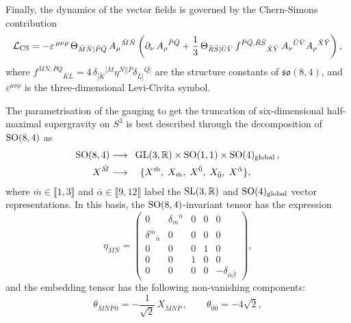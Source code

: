 \documentclass[11pt,a4paper]{article}
\newcommand{\bM}{{\bar{M}}}
\newcommand{\bN}{{\bar{N}}}
\newcommand{\bP}{{\bar{P}}}
\newcommand{\bzero}{{\bar{0}}}
\newcommand{\balpha}{{\bar{\alpha}}}
\newcommand{\bbeta}{{\bar{\beta}}}
\begin{document}
Finally, the dynamics of the vector fields is governed by the Chern-Simons contribution
%
\begin{equation}
	{\cal L}_{\rm CS}= -\varepsilon^{\,\mu\nu\rho}\,\Theta_{\bar M\bar N|\bar P\bar Q}\,A_{\mu}{}^{\bar M\bar N}\left(\partial_{\nu}\,A_{\rho}{}^{\bar P\bar Q}  + \frac{1}{3}\, \Theta_{\bar R\bar S|\bar U\bar V}\,f^{\bar P\bar Q,\bar R\bar S}{}_{\bar X\bar Y}\, A_{\nu}{}^{\bar U\bar V} A_{\rho}{}^{\bar X\bar Y} \right),
\end{equation}
%
where $f^{\bar M\bar N,\bar P\bar Q}{}_{\bar K\bar L} = 4\,\delta_{[\bar K}{}^{[\bar M}\eta^{\bar N][\bar P}\delta_{\bar L]}{}^{\bar Q]}$ are the structure constants of $\mathfrak{so}(8,4)$, and $\varepsilon^{\mu\nu\rho}$ is the three-dimensional Levi-Civita symbol.

The parametrisation of the gauging to get the truncation of six-dimensional half-maximal supergravity on $S^{3}$ is best described through the decomposition of ${\rm SO}(8,4)$ as~\cite{Eloy:2021fhc} 
%
\begin{equation}	\label{eq: gl3gradingbar}
	\begin{aligned}
		\text{SO}(8,4)	&\longrightarrow	\enspace \text{GL}(3,\mathbb{R})\times\text{SO}(1,1)\times\text{SO}(4)_{\rm global}\,,	\\
		X^{\bM}		&\longrightarrow	\quad \{X^{\bar m},\; X_{\bar m},\; X^\bzero,\; X_\bzero,\; X^\balpha\},
	\end{aligned}
\end{equation}
where $\bar m\in\llbracket1,3\rrbracket$ and $\balpha\in\llbracket9,12\rrbracket$ label the ${\rm SL}(3, \mathbb{R})$ and ${\rm SO}(4)_{\rm global}$ vector representations. In this basis, the ${\rm SO}(8,4)$-invariant tensor has the expression
%
\begin{equation}
	\eta_{\bM\bN}=
	\begin{pmatrix}
		0 & \delta_{\bar m}{}^{\bar n} & 0 & 0 &0\\
		\delta^{\bar m}{}_{\bar n} & 0 & 0 & 0 &0\\
		0 & 0 & 0 & 1 & 0\\
		0 & 0 & 1 & 0 & 0\\
		0 & 0 & 0 & 0 & -\delta_{\balpha\bbeta}
	\end{pmatrix},
\end{equation}
and the embedding tensor has the following non-vanishing components:
\begin{equation} \label{eq:embedtens}
	\theta_{\bM\bN\bP\,\bzero}=-\frac{1}{\sqrt{2}}\,X_{\bM\bN\bP}\,,		\qquad	\theta_{\bzero\bzero}=-4\sqrt{2},	
\end{equation}
\end{document}
